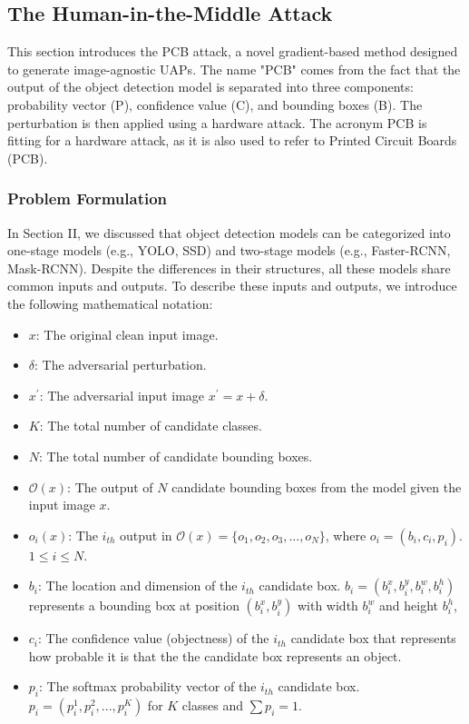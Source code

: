 
\subsection{The Human-in-the-Middle Attack}

This section introduces the PCB attack, a novel gradient-based method designed to generate image-agnostic UAPs. The name "PCB" comes from the fact that the output of the object detection model is separated into three components: probability vector (P), confidence value (C), and bounding boxes (B). The perturbation is then applied using a hardware attack. The acronym PCB is fitting for a hardware attack, as it is also used to refer to Printed Circuit Boards (PCB).

\subsubsection{Problem Formulation} 


In Section II, we discussed that object detection models can be categorized into one-stage models (e.g., YOLO, SSD) and two-stage models (e.g., Faster-RCNN, Mask-RCNN). Despite the differences in their structures, all these models share common inputs and outputs. To describe these inputs and outputs, we introduce the following mathematical notation:

\begin{itemize}
    \item $x$: The original clean input image.
    \item $\delta$: The adversarial perturbation.
    \item $x^{'}$: The adversarial input image $x^{'} = x + \delta$.
    \item $K$: The total number of candidate classes.
    \item $N$: The total number of candidate bounding boxes.
    \item $\mathcal{O}(x)$: The output of $N$ candidate bounding boxes from the model given the input image $x$. 
    \item $o_i(x)$: The $i_{th}$ output in $\mathcal{O}(x) = \{o_1, o_2, o_3, ..., o_N\}$, where $o_i=(b_i, c_i, p_i)$. $1 \leq i \leq N$.
    \item $b_i$: The location and dimension of the $i_{th}$ candidate box. $b_i=(b^x_i, b^y_i, b^w_i, b^h_i)$ represents a bounding box at position $(b^x_i, b^y_i)$ with width $b^w_i$ and height $b^h_i$,
    \item $c_i$: The confidence value (objectness) of the $i_{th}$ candidate box that represents how probable it is that the the candidate box represents an object.
    \item $p_i$: The softmax probability vector of the $i_{th}$ candidate box. $p_i=(p^1_i, p^2_i, ..., p^K_i)$ for $K$ classes and $\sum{p_i}=1$.
\end{itemize}

